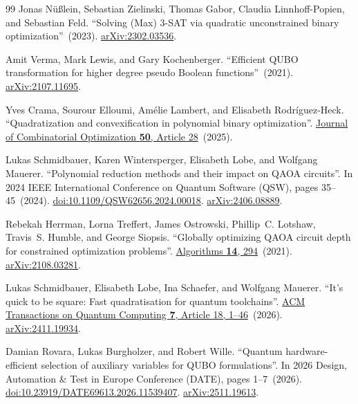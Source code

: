 \documentclass[a4paper,onecolumn,11pt,unpublished]{quantumarticle}
\theoremstyle{remark}
\begin{document}
\begin{thebibliography}{99}
Jonas N{\"u}{\ss}lein, Sebastian Zielinski, Thomas Gabor, Claudia Linnhoff-Popien, and Sebastian Feld.
\newblock ``Solving (Max) 3-SAT via quadratic unconstrained binary optimization''~(2023).
\newblock \href{http://arxiv.org/abs/2302.03536}{arXiv:2302.03536}.

Amit Verma, Mark Lewis, and Gary Kochenberger.
\newblock ``Efficient QUBO transformation for higher degree pseudo Boolean functions''~(2021).
\newblock \href{http://arxiv.org/abs/2107.11695}{arXiv:2107.11695}.

Yves Crama, Sourour Elloumi, Am{\'e}lie Lambert, and Elisabeth Rodr{\'i}guez-Heck.
\newblock ``Quadratization and convexification in polynomial binary optimization''.
\newblock \href{https://dx.doi.org/10.1007/s10878-025-01334-y}{Journal of Combinatorial Optimization {\bf 50}, Article 28}~(2025).

Lukas Schmidbauer, Karen Wintersperger, Elisabeth Lobe, and Wolfgang Mauerer.
\newblock ``Polynomial reduction methods and their impact on QAOA circuits''.
\newblock In 2024 IEEE International Conference on Quantum Software (QSW), pages 35--45~(2024).
\newblock \href{https://dx.doi.org/10.1109/QSW62656.2024.00018}{doi:10.1109/QSW62656.2024.00018}.
\newblock \href{http://arxiv.org/abs/2406.08889}{arXiv:2406.08889}.

Rebekah Herrman, Lorna Treffert, James Ostrowski, Phillip~C. Lotshaw, Travis~S. Humble, and George Siopsis.
\newblock ``Globally optimizing QAOA circuit depth for constrained optimization problems''.
\newblock \href{https://dx.doi.org/10.3390/a14100294}{Algorithms {\bf 14}, 294}~(2021).
\newblock \href{http://arxiv.org/abs/2108.03281}{arXiv:2108.03281}.

Lukas Schmidbauer, Elisabeth Lobe, Ina Schaefer, and Wolfgang Mauerer.
\newblock ``It's quick to be square: Fast quadratisation for quantum toolchains''.
\newblock \href{https://dx.doi.org/10.1145/3800943}{ACM Transactions on Quantum Computing {\bf 7}, Article 18, 1--46}~(2026).
\newblock \href{http://arxiv.org/abs/2411.19934}{arXiv:2411.19934}.

Damian Rovara, Lukas Burgholzer, and Robert Wille.
\newblock ``Quantum hardware-efficient selection of auxiliary variables for QUBO formulations''.
\newblock In 2026 Design, Automation \& Test in Europe Conference (DATE), pages 1--7~(2026).
\newblock \href{https://dx.doi.org/10.23919/DATE69613.2026.11539407}{doi:10.23919/DATE69613.2026.11539407}.
\newblock \href{http://arxiv.org/abs/2511.19613}{arXiv:2511.19613}.


\end{thebibliography}
\end{document}
